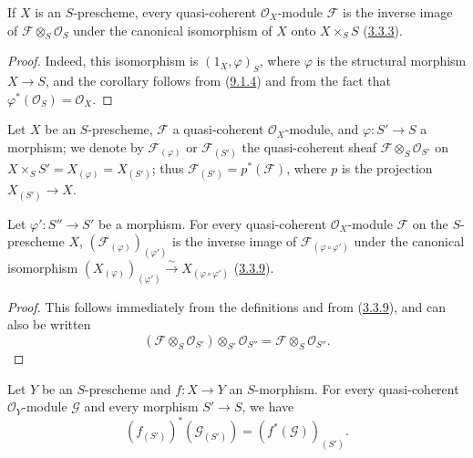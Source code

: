 \begin{corollary}[9.1.7]
\label{I.9.1.7}
If $X$ is an $S$-prescheme, every quasi-coherent $\mathscr{O}_X$-module
$\mathscr{F}$ is the inverse image of
$\mathscr{F}\otimes_S\mathscr{O}_S$ under the canonical isomorphism of $X$
onto $X\times_S S$ \textup{(\hyperref[I.3.3.3]{3.3.3})}.
\end{corollary}

\begin{proof}
Indeed, this isomorphism is $(1_X,\varphi)_S$, where $\varphi$ is the
structural morphism $X\to S$, and the corollary follows from
(\hyperref[I.9.1.4]{9.1.4}) and from the fact that
$\varphi^*(\mathscr{O}_S)=\mathscr{O}_X$.
\end{proof}

\begin{env}[9.1.8]
\label{I.9.1.8}
Let $X$ be an $S$-prescheme, $\mathscr{F}$ a quasi-coherent
$\mathscr{O}_X$-module, and $\varphi:S'\to S$ a morphism; we denote by
$\mathscr{F}_{(\varphi)}$ or $\mathscr{F}_{(S')}$ the quasi-coherent
sheaf $\mathscr{F}\otimes_S\mathscr{O}_{S'}$ on
$X\times_S S'=X_{(\varphi)}=X_{(S')}$; thus
$\mathscr{F}_{(S')}=p^*(\mathscr{F})$, where $p$ is the projection
$X_{(S')}\to X$.
\end{env}

\begin{proposition}[9.1.9]
\label{I.9.1.9}
Let $\varphi':S''\to S'$ be a morphism. For every quasi-coherent
$\mathscr{O}_X$-module $\mathscr{F}$ on the $S$-prescheme $X$,
$(\mathscr{F}_{(\varphi)})_{(\varphi')}$ is the inverse image of
$\mathscr{F}_{(\varphi\circ\varphi')}$ under the canonical isomorphism
$(X_{(\varphi)})_{(\varphi')}\xrightarrow{\sim}
X_{(\varphi\circ\varphi')}$ \textup{(\hyperref[I.3.3.9]{3.3.9})}.
\end{proposition}

\begin{proof}
This follows immediately from the definitions and from
(\hyperref[I.3.3.9]{3.3.9}), and can also be written
\[
  (\mathscr{F}\otimes_S\mathscr{O}_{S'})
  \otimes_{S'}\mathscr{O}_{S''}
  =\mathscr{F}\otimes_S\mathscr{O}_{S''}.
  \tag{9.1.9.1}\label{I.9.1.9.1}
\]
\end{proof}

\begin{proposition}[9.1.10]
\label{I.9.1.10}
Let $Y$ be an $S$-prescheme and $f:X\to Y$ an $S$-morphism. For every
quasi-coherent $\mathscr{O}_Y$-module $\mathscr{G}$ and every morphism
$S'\to S$, we have
\[
  (f_{(S')})^*(\mathscr{G}_{(S')})
  =(f^*(\mathscr{G}))_{(S')}.
\]
\end{proposition}

